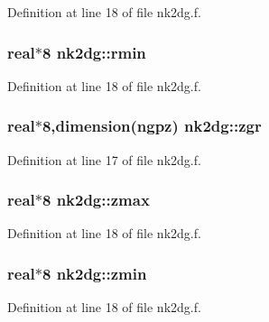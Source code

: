 Definition at line 18 of file nk2dg.f.\hypertarget{namespacenk2dg_395609fb530be70486fc118f6f819b3a}{
\subsubsection[rmin]{\setlength{\rightskip}{0pt plus 5cm}real$\ast$8 {\bf nk2dg::rmin}}}
\label{namespacenk2dg_395609fb530be70486fc118f6f819b3a}




Definition at line 18 of file nk2dg.f.\hypertarget{namespacenk2dg_fe36aa20b7f59d22623f4125397651d6}{
\subsubsection[zgr]{\setlength{\rightskip}{0pt plus 5cm}real$\ast$8,dimension(ngpz) {\bf nk2dg::zgr}}}
\label{namespacenk2dg_fe36aa20b7f59d22623f4125397651d6}




Definition at line 17 of file nk2dg.f.\hypertarget{namespacenk2dg_ba6a5a016ae20d3d4055b43ed890a3b2}{
\subsubsection[zmax]{\setlength{\rightskip}{0pt plus 5cm}real$\ast$8 {\bf nk2dg::zmax}}}
\label{namespacenk2dg_ba6a5a016ae20d3d4055b43ed890a3b2}




Definition at line 18 of file nk2dg.f.\hypertarget{namespacenk2dg_08d442b8e9fa8d3621dbd6c09ee2b4be}{
\subsubsection[zmin]{\setlength{\rightskip}{0pt plus 5cm}real$\ast$8 {\bf nk2dg::zmin}}}
\label{namespacenk2dg_08d442b8e9fa8d3621dbd6c09ee2b4be}




Definition at line 18 of file nk2dg.f.